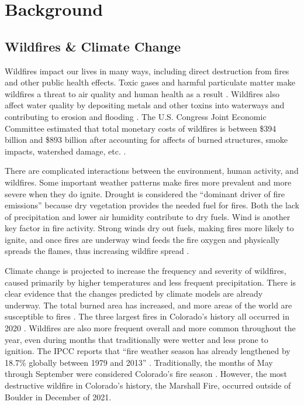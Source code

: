 \documentclass[11pt]{article}%
\begin{document}
\newpage
\tableofcontents
\newpage

\section{Background}
\subsection{Wildfires \& Climate Change}

Wildfires impact our lives in many ways, including direct destruction from fires and other public health effects. Toxic gases and harmful particulate matter make wildfires a threat to air quality and human health as a result \cite{who_wildfires}. Wildfires also affect water quality by depositing metals and other toxins into waterways and contributing to erosion and flooding \cite{usgs_wildfires}. The U.S. Congress Joint Economic Committee estimated that total monetary costs of wildfires is between \$394 billion and \$893 billion after accounting for affects of burned structures, smoke impacts, watershed damage, etc. \cite{jec_wildfires}.

There are complicated interactions between the environment, human activity, and wildfires. Some important weather patterns make fires more prevalent and more severe when they do ignite. Drought is considered the “dominant driver of fire emissions” \cite{ipcc} because dry vegetation provides the needed fuel for fires. Both the lack of precipitation and lower air humidity contribute to dry fuels. Wind is another key factor in fire activity. Strong winds dry out fuels, making fires more likely to ignite, and once fires are underway wind feeds the fire oxygen and physically spreads the flames, thus increasing wildfire spread \cite{Richardson-2022-GIW}.

Climate change is projected to increase the frequency and severity of wildfires, caused primarily by higher temperatures and less frequent precipitation. There is clear evidence that the changes predicted by climate models are already underway. The total burned area has increased, and more areas of the world are susceptible to fires \cite{ipcc}. The three largest fires in Colorado’s history all occurred in 2020 \cite{co_dfpc}. Wildfires are also more frequent overall and more common throughout the year, even during months that traditionally were wetter and less prone to ignition. The IPCC  reports that “fire weather season has already lengthened by 18.7\% globally between 1979 and 2013” \cite{ipcc}. Traditionally, the months of May through September were considered Colorado’s fire season \cite{WFCA-2023-CFS}. However, the most destructive wildfire in Colorado’s history, the Marshall Fire, occurred outside of Boulder in December of 2021. \cite{co_dfpc} 
\end{document}
